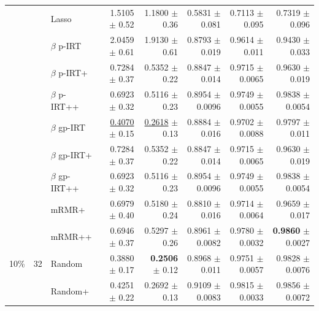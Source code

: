 \begin{longtable}{llp{}rrrrr}
 &  & Lasso & 1.5105 {\scriptsize $\pm$ 0.52} & 1.1800 {\scriptsize $\pm$ 0.36} & 0.5831 {\scriptsize $\pm$ 0.081} & 0.7113 {\scriptsize $\pm$ 0.095} & 0.7319 {\scriptsize $\pm$ 0.096} \\
 &  & $\beta$ p-IRT & 2.0459 {\scriptsize $\pm$ 0.61} & 1.9130 {\scriptsize $\pm$ 0.61} & 0.8793 {\scriptsize $\pm$ 0.019} & 0.9614 {\scriptsize $\pm$ 0.011} & 0.9430 {\scriptsize $\pm$ 0.033} \\
 &  & $\beta$ p-IRT+ & 0.7284 {\scriptsize $\pm$ 0.37} & 0.5352 {\scriptsize $\pm$ 0.22} & 0.8847 {\scriptsize $\pm$ 0.014} & 0.9715 {\scriptsize $\pm$ 0.0065} & 0.9630 {\scriptsize $\pm$ 0.019} \\
 &  & $\beta$ p-IRT++ & 0.6923 {\scriptsize $\pm$ 0.32} & 0.5116 {\scriptsize $\pm$ 0.23} & 0.8954 {\scriptsize $\pm$ 0.0096} & 0.9749 {\scriptsize $\pm$ 0.0055} & 0.9838 {\scriptsize $\pm$ 0.0054} \\
 &  & $\beta$ gp-IRT & \underline{0.4070} {\scriptsize $\pm$ 0.15} & \underline{0.2618} {\scriptsize $\pm$ 0.13} & 0.8884 {\scriptsize $\pm$ 0.016} & 0.9702 {\scriptsize $\pm$ 0.0088} & 0.9797 {\scriptsize $\pm$ 0.011} \\
 &  & $\beta$ gp-IRT+ & 0.7284 {\scriptsize $\pm$ 0.37} & 0.5352 {\scriptsize $\pm$ 0.22} & 0.8847 {\scriptsize $\pm$ 0.014} & 0.9715 {\scriptsize $\pm$ 0.0065} & 0.9630 {\scriptsize $\pm$ 0.019} \\
 &  & $\beta$ gp-IRT++ & 0.6923 {\scriptsize $\pm$ 0.32} & 0.5116 {\scriptsize $\pm$ 0.23} & 0.8954 {\scriptsize $\pm$ 0.0096} & 0.9749 {\scriptsize $\pm$ 0.0055} & 0.9838 {\scriptsize $\pm$ 0.0054} \\
 &  & mRMR+ & 0.6979 {\scriptsize $\pm$ 0.40} & 0.5180 {\scriptsize $\pm$ 0.24} & 0.8810 {\scriptsize $\pm$ 0.016} & 0.9714 {\scriptsize $\pm$ 0.0064} & 0.9659 {\scriptsize $\pm$ 0.017} \\
 &  & mRMR++ & 0.6946 {\scriptsize $\pm$ 0.37} & 0.5297 {\scriptsize $\pm$ 0.26} & 0.8961 {\scriptsize $\pm$ 0.0082} & 0.9780 {\scriptsize $\pm$ 0.0032} & \textbf{0.9860} {\scriptsize $\pm$ 0.0027} \\
\midrule
10\% & 32 & Random & 0.3880 {\scriptsize $\pm$ 0.17} & \textbf{0.2506} {\scriptsize $\pm$ 0.12} & 0.8968 {\scriptsize $\pm$ 0.011} & 0.9751 {\scriptsize $\pm$ 0.0057} & 0.9828 {\scriptsize $\pm$ 0.0076} \\
 &  & Random+ & 0.4251 {\scriptsize $\pm$ 0.22} & 0.2692 {\scriptsize $\pm$ 0.13} & 0.9109 {\scriptsize $\pm$ 0.0083} & 0.9815 {\scriptsize $\pm$ 0.0033} & 0.9856 {\scriptsize $\pm$ 0.0072} \\

\end{longtable}
